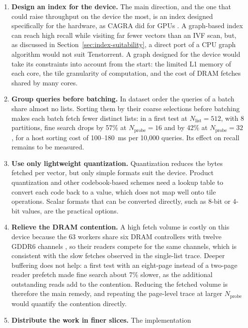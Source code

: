 \begin{enumerate}
    \item \textbf{Design an index for the device.} The main direction, and
    the one that could raise throughput on the device the most, is an index
    designed specifically for the hardware, as CAGRA did for GPUs
    \cite{cagra}. A graph-based index can reach high recall
    while visiting far fewer vectors than an IVF scan, but, as discussed in
    Section~\ref{sec:index-suitability}, a direct port of a CPU graph
    algorithm would not suit Tenstorrent. A graph designed for the device
    would take its constraints into account from the start: the limited L1
    memory of each core, the tile granularity of computation, and the cost of
    DRAM fetches shared by many cores.
    \item \textbf{Group queries before batching.} In dataset order the queries
    of a batch share almost no lists. Sorting them by their coarse selections
    before batching makes each batch fetch fewer distinct lists: in a first
    test at \(N_{\mathrm{list}}=512\), with 8 partitions, fine search drops by
    57\% at \(N_{\mathrm{probe}}=16\) and by 42\% at \(N_{\mathrm{probe}}=32\),
    for a host sorting cost of 100--180~ms per 10,000 queries. Its effect on
    recall remains to be measured.
    \item \textbf{Use only lightweight quantization.} Quantization reduces the
    bytes fetched per vector, but only simple formats suit the device.
    Product quantization and other codebook-based schemes need a lookup table
    to convert each code back to a value, which does not map well onto tile
    operations. Scalar formats that can be converted directly, such as 8-bit
    or 4-bit values, are the practical options.
    \item \textbf{Relieve the DRAM contention.} A high fetch volume is costly
    on this device because the 63 workers share six DRAM controllers with
    twelve GDDR6 channels \cite{tenstorrent_wormhole_spec}, so their readers
    compete for the same channels, which is consistent with the slow fetches
    observed in the single-list trace. Deeper buffering does not help: a
    first test with an eight-page instead of a two-page reader prefetch made
    fine search about 7\% slower, as the additional outstanding reads add to
    the contention. Reducing the fetched volume is therefore the main remedy,
    and repeating the page-level trace at larger \(N_{\mathrm{probe}}\)
    would quantify the contention directly.
    \item \textbf{Distribute the work in finer slices.} The implementation

\end{enumerate}
